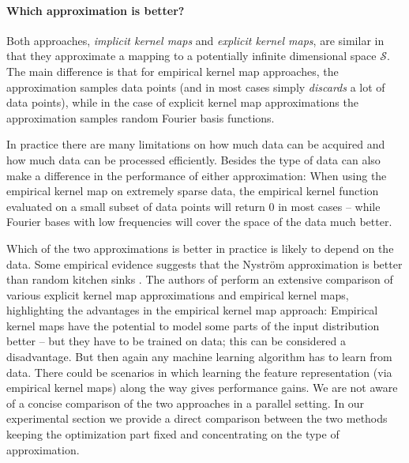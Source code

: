 \documentclass{article} %
\begin{document}
\paragraph{Which approximation is better?}
Both approaches, {\em implicit kernel maps} and {\em explicit kernel maps}, are similar in that they approximate a mapping to a potentially infinite dimensional space $\mathcal{S}$. The main difference is that for empirical kernel map approaches, the approximation samples data points (and in most cases simply {\em discards} a lot of data points), while in the case of explicit kernel map approximations the approximation samples random Fourier basis functions. 

In practice there are many limitations on how much data can be acquired and how much data can be processed efficiently. Besides the type of data can also make a difference in the performance of either approximation: When using the empirical kernel map on extremely sparse data, the empirical kernel function evaluated on a small subset of data points will return 0 in most cases -- while Fourier bases with low frequencies will cover the space of the data much better. 

Which of the two approximations is better in practice is likely to depend on the data. 
Some empirical evidence suggests that the Nystr\"om approximation is better than random kitchen sinks \cite{Yang2012}. The authors of \cite{Vedaldi2010} perform an extensive comparison of various explicit kernel map approximations and empirical kernel maps, highlighting the advantages in the empirical kernel map approach: Empirical kernel maps have the potential to model some parts of the input distribution better -- but they have to be trained on data; this can be considered  a disadvantage. But then again any machine learning algorithm has to learn from data. There could be scenarios in which learning the feature representation (via empirical kernel maps) along the way gives performance gains. We are not aware of a concise comparison of the two approaches in a parallel setting. In our experimental section we provide a direct comparison between the two methods keeping the optimization part fixed and concentrating on the type of approximation. 
%
\end{document}
